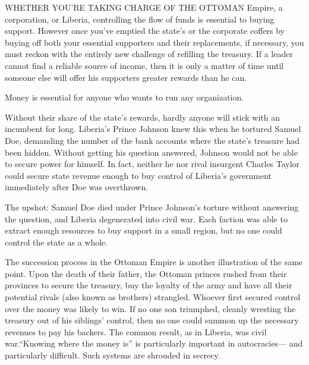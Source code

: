 \documentclass[10pt]{article}
\begin{document}
{\large WHETHER YOU'RE TAKING CHARGE OF THE OTTOMAN Empire, a corporation, or
Liberia, controlling the flow of funds is essential to buying support. However
once you've emptied the state's or the corporate coffers by buying off both your
essential supporters and their replacements, if necessary, you must reckon with
the entirely new challenge of refilling the treasury. If a leader cannot find a
reliable source of income, then it is only a matter of time until someone else
will offer his supporters greater rewards than he can.}

{\large Money is essential for anyone who wants to run any organization.}

{\large Without their share of the state's rewards, hardly anyone will stick
with an incumbent for long. Liberia's Prince Johnson knew this when he tortured
Samuel Doe, demanding the number of the bank accounts where the state's treasure
had been hidden. Without getting his question answered, Johnson would not be able
to secure power for himself. In fact, neither he nor rival insurgent Charles
Taylor could secure state revenue enough to buy control of Liberia's government
immediately after Doe was overthrown.}

{\large The upshot: Samuel Doe died under Prince Johnson's torture without
answering the question, and Liberia degenerated into civil war. Each faction was
able to extract enough resources to buy support in a small region, but no one
could control the state as a whole.}

{\large The succession process in the Ottoman Empire is another illustration of
the same point. Upon the death of their father, the Ottoman princes rushed from
their provinces to secure the treasury, buy the loyalty of the army and have all
their potential rivals (also known as brothers) strangled. Whoever first secured
control over the money was likely to win. If no one son triumphed, cleanly
wresting the treasury out of his siblings' control, then no one could summon up
the necessary revenues to pay his backers. The common result, as in Liberia, was
civil war.``Knowing where the money is'' is particularly important in
autocracies--- and particularly difficult. Such systems are shrouded in secrecy.}
\end{document}
